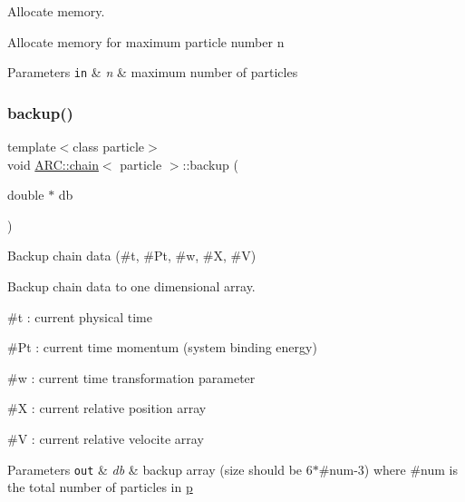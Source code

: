 Allocate memory. 

Allocate memory for maximum particle number n 
\begin{DoxyParams}[1]{Parameters}
\mbox{\tt in}  & {\em n} & maximum number of particles \\
\hline
\end{DoxyParams}
\hypertarget{classARC_1_1chain_a587009b6c6db0490c0f335aba732d77a}{}\label{classARC_1_1chain_a587009b6c6db0490c0f335aba732d77a} 
\subsubsection{\texorpdfstring{backup()}{backup()}}
{\footnotesize\ttfamily template$<$class particle$>$ \\
void \hyperlink{classARC_1_1chain}{A\+R\+C\+::chain}$<$ particle $>$\+::backup (\begin{DoxyParamCaption}\item[{double $\ast$}]{db }\end{DoxyParamCaption})\hspace{0.3cm}{\ttfamily [inline]}}



Backup chain data (\#t, \#\+Pt, \#w, \#X, \#V) 

Backup chain data to one dimensional array.
\begin{DoxyItemize}
\item \#t \+: current physical time
\item \#\+Pt \+: current time momentum (system binding energy)
\item \#w \+: current time transformation parameter
\item \#X \+: current relative position array
\item \#V \+: current relative velocite array 
\begin{DoxyParams}[1]{Parameters}
\mbox{\tt out}  & {\em db} & backup array (size should be 6$\ast$\#num-\/3) where \#num is the total number of particles in \hyperlink{classARC_1_1chain_af1793b656e139e1f87c2e0a55f87514b}{p} \\
\hline
\end{DoxyParams}

\end{DoxyItemize}\hypertarget{classARC_1_1chain_a68ae268afb418455bfdd6e8101b3b4eb}{}\label{classARC_1_1chain_a68ae268afb418455bfdd6e8101b3b4eb} 
